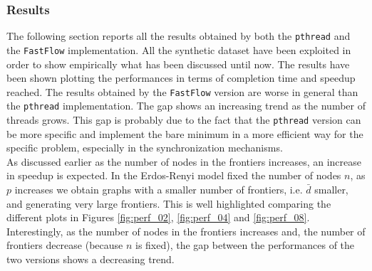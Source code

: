 \subsubsection{Results}
The following section reports all the results obtained by both the \texttt{pthread} and the \texttt{FastFlow} implementation. All the synthetic dataset have been exploited in order to show empirically what has been discussed until now. The results have been shown plotting the performances in terms of completion time and speedup reached. The results obtained by the 
\texttt{FastFlow} version are worse in general than the \texttt{pthread} implementation. The gap shows an increasing trend as the number of threads grows. This gap is probably due to the fact that the \texttt{pthread} version can be more specific and implement the bare minimum in a more efficient way for the specific problem, especially in the synchronization mechanisms. 
\\
As discussed earlier as the number of nodes in the frontiers increases, an increase in speedup is expected. In the Erdos-Renyi model fixed the number of nodes $n$, as $p$ increases we obtain graphs with a smaller number of frontiers, i.e. $\bar{d}$ smaller, and generating very large frontiers. This is well highlighted comparing the different plots in Figures
\ref{fig:perf_02}, \ref{fig:perf_04} and \ref{fig:perf_08}. Interestingly, as the number of nodes in the frontiers increases and, the number of frontiers decrease (because $n$ is fixed), the gap between the performances of the two versions shows a decreasing trend.

